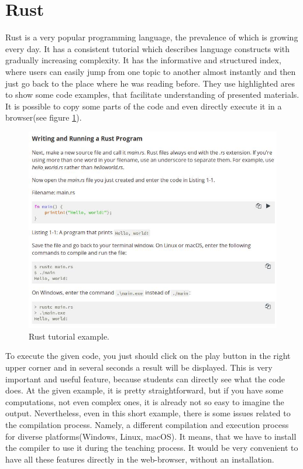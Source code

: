 \section{Rust} \label{sec:rust}
Rust \cite{Rust} is a very popular programming language, the prevalence of which is growing every day. It has a consistent tutorial which describes language constructs with gradually increasing complexity. It has the informative and structured index, where users can easily jump from one topic to another almost instantly and then just go back to the place where he was reading before. They use highlighted ares to show some code examples, that facilitate understanding of presented materials. It is possible to copy some parts of the code and even directly execute it in a browser(see figure \ref{fig:rust}).
\begin{figure}[h!]
    \centering
    \includegraphics[width=0.7\linewidth]{src/pic/rust}
    \caption{Rust tutorial example.}
    \label{fig:rust}
\end{figure}
To execute the given code, you just should click on the play button in the right upper corner and in several seconds a result will be displayed. This is very important and useful feature, because students can directly see what the code does. At the given example, it is pretty straightforward, but if you have some computations, not even complex ones, it is already not so easy to imagine the output. Nevertheless, even in this short example, there is some issues related to the compilation process. Namely, a different compilation and execution process for diverse platforms(Windows, Linux, macOS). It means, that we have to install the compiler to use it during the teaching process. It would be very convenient to have all these features directly in the web-browser, without an installation.

